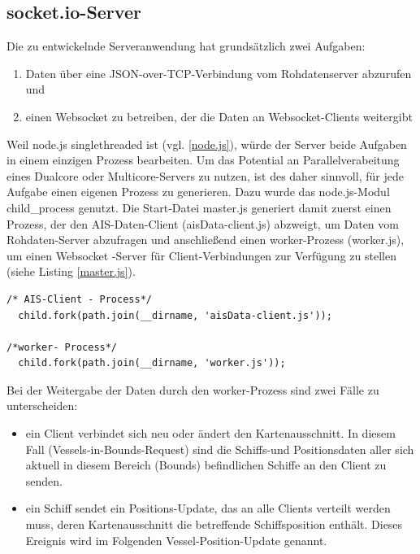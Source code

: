 \subsection{socket.io-Server}\label{socket.io-Server}
Die zu entwickelnde Serveranwendung hat grundsätzlich zwei Aufgaben: 
\begin{enumerate}
\item Daten über eine JSON-over-TCP-Verbindung vom Rohdatenserver abzurufen und
\item einen Websocket zu betreiben, der die Daten an Websocket-Clients weitergibt
\end{enumerate}
Weil node.js singlethreaded ist (vgl. \ref{node.js}), würde der Server beide Aufgaben in einem einzigen Prozess bearbeiten. Um das Potential an Parallelverabeitung eines Dualcore oder Multicore-Servers zu nutzen, ist des daher sinnvoll, für jede Aufgabe einen eigenen Prozess zu generieren. Dazu wurde das node.js-Modul child\_process genutzt. Die Start-Datei master.js generiert damit zuerst einen Prozess, der den AIS-Daten-Client (aisData-client.js) abzweigt, um Daten vom Rohdaten-Server abzufragen und anschließend einen worker-Prozess (worker.js), um einen Websocket -Server für Client-Verbindungen zur Verfügung zu stellen (siehe Listing \ref{master.js}).
\begin{lstlisting}[caption=Generierung von Kindprozessen in master.js, firstnumber=16, label=master.js]
/* AIS-Client - Process*/
  child.fork(path.join(__dirname, 'aisData-client.js'));

/*worker- Process*/
  child.fork(path.join(__dirname, 'worker.js'));
\end{lstlisting}
Bei der Weitergabe der Daten durch den worker-Prozess sind zwei Fälle zu unterscheiden:
\begin{itemize}
\item ein Client verbindet sich neu oder ändert den Kartenausschnitt. In diesem Fall (Vessels-in-Bounds-Request) sind die Schiffs-und Positionsdaten aller sich aktuell in diesem Bereich (Bounds) befindlichen Schiffe an den Client zu senden.
\item ein Schiff sendet ein Positions-Update, das an alle Clients verteilt werden muss, deren Kartenausschnitt die betreffende Schiffsposition enthält. Dieses Ereignis wird im Folgenden Vessel-Position-Update genannt.
\end{itemize}

